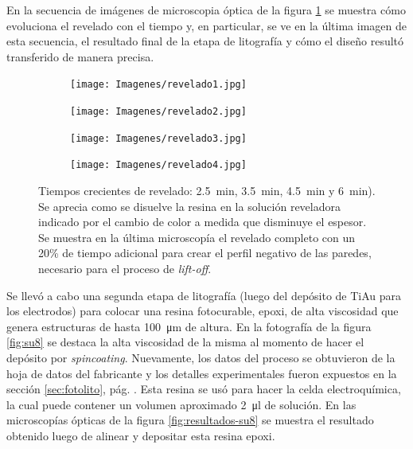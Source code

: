  	         En la secuencia de imágenes de microscopia óptica de la figura \ref{fig:revelado} se muestra cómo evoluciona el revelado con el tiempo y, en particular, se ve en la última imagen de esta secuencia, el resultado final de la etapa de litografía y cómo el diseño resultó transferido de manera precisa.

 				\begin{figure}[h!]
			 	   	    \centering
			 	   	    \begin{subfigure}[t]{0.495\textwidth}
			        	\texttt{[image: Imagenes/revelado1.jpg]}
			       		\end{subfigure}
			     		\begin{subfigure}[t]{0.495\textwidth}
			     		\texttt{[image: Imagenes/revelado2.jpg]}
			    		\end{subfigure}
			     		\begin{subfigure}[t]{0.495\textwidth}
						\vspace*{-0.3cm}
			     		\texttt{[image: Imagenes/revelado3.jpg]}
			        	\end{subfigure}
						\begin{subfigure}[t]{0.495\textwidth}
			     		\vspace*{-0.3cm}
			     		\texttt{[image: Imagenes/revelado4.jpg]}
			        	\end{subfigure}
			     		\caption[Revelado en función del tiempo]{Tiempos crecientes de revelado: \SI{2.5}{min}, \SI{3.5}{min}, \SI{4.5}{min} y \SI{6}{min}). Se aprecia como se disuelve la resina en la solución reveladora indicado por el cambio de color a medida que disminuye el espesor. Se muestra en la última microscopía el revelado completo con un 20\% de tiempo adicional para crear el perfil negativo de las paredes, necesario para el proceso de\textit{ lift-off}.}
			     		\label{fig:revelado}
			     	   	\end{figure}

			  \vspace*{2mm}Se llevó a cabo una segunda etapa de litografía (luego del depósito de Ti\textbar Au para los electrodos) para colocar una resina fotocurable, epoxi, de alta viscosidad que genera estructuras de hasta \SI{100}{\um} de altura. En la fotografía de la figura \ref{fig:su8} se destaca la alta viscosidad de la misma al momento de hacer el depósito por \textit{spincoating}. Nuevamente, los datos del proceso se obtuvieron de la hoja de datos del fabricante\cite{Su8,Microchemicals2014} y los detalles experimentales fueron expuestos en  la sección \ref{sec:fotolito}, pág. \pageref{sec:fotolito}. \pagebreak   Esta resina se usó para hacer la celda electroquímica, la cual puede contener un volumen aproximado \SI{2}{\ul} de solución. En las microscopías ópticas de la figura \ref{fig:resultados-su8} se muestra el resultado obtenido luego de alinear y depositar esta resina epoxi.

